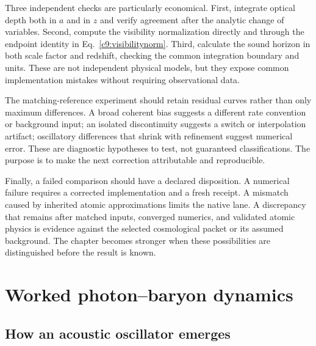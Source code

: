 Three independent checks are particularly economical. First, integrate optical depth both in $a$ and in $z$ and verify agreement after the analytic change of variables. Second, compute the visibility normalization directly and through the endpoint identity in Eq.~\eqref{c9:visibilitynorm}. Third, calculate the sound horizon in both scale factor and redshift, checking the common integration boundary and units. These are not independent physical models, but they expose common implementation mistakes without requiring observational data.

The matching-reference experiment should retain residual curves rather than only maximum differences. A broad coherent bias suggests a different rate convention or background input; an isolated discontinuity suggests a switch or interpolation artifact; oscillatory differences that shrink with refinement suggest numerical error. These are diagnostic hypotheses to test, not guaranteed classifications. The purpose is to make the next correction attributable and reproducible.

Finally, a failed comparison should have a declared disposition. A numerical failure requires a corrected implementation and a fresh receipt. A mismatch caused by inherited atomic approximations limits the native lane. A discrepancy that remains after matched inputs, converged numerics, and validated atomic physics is evidence against the selected cosmological packet or its assumed background. The chapter becomes stronger when these possibilities are distinguished before the result is known.

\section{Worked photon--baryon dynamics}
\subsection{How an acoustic oscillator emerges}

